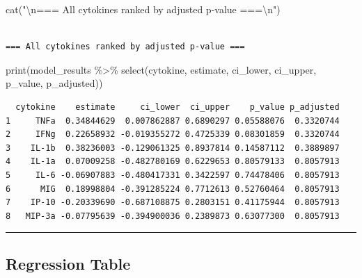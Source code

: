 \documentclass[
  letterpaper,
  DIV=11,
  numbers=noendperiod]{scrartcl}
\newenvironment{Shaded}{\begin{snugshade}}{\end{snugshade}}
\newcommand{\FunctionTok}[1]{\textcolor[rgb]{0.28,0.35,0.67}{#1}}
\newcommand{\NormalTok}[1]{\textcolor[rgb]{0.00,0.23,0.31}{#1}}
\newcommand{\SpecialCharTok}[1]{\textcolor[rgb]{0.37,0.37,0.37}{#1}}
\newcommand{\StringTok}[1]{\textcolor[rgb]{0.13,0.47,0.30}{#1}}
\begin{document}
\begin{Shaded}
\begin{Highlighting}[]
\FunctionTok{cat}\NormalTok{(}\StringTok{"}\SpecialCharTok{\textbackslash{}n}\StringTok{=== All cytokines ranked by adjusted p{-}value ===}\SpecialCharTok{\textbackslash{}n}\StringTok{"}\NormalTok{)}
\end{Highlighting}
\end{Shaded}

\begin{verbatim}

=== All cytokines ranked by adjusted p-value ===
\end{verbatim}

\begin{Shaded}
\begin{Highlighting}[]
\FunctionTok{print}\NormalTok{(model\_results }\SpecialCharTok{\%\textgreater{}\%} \FunctionTok{select}\NormalTok{(cytokine, estimate, ci\_lower, ci\_upper, p\_value, p\_adjusted))}
\end{Highlighting}
\end{Shaded}

\begin{verbatim}
  cytokine    estimate     ci_lower  ci_upper    p_value p_adjusted
1     TNFa  0.34844629  0.007862887 0.6890297 0.05588076  0.3320744
2     IFNg  0.22658932 -0.019355272 0.4725339 0.08301859  0.3320744
3    IL-1b  0.38236003 -0.129061325 0.8937814 0.14587112  0.3889897
4    IL-1a  0.07009258 -0.482780169 0.6229653 0.80579133  0.8057913
5     IL-6 -0.06907883 -0.480417331 0.3422597 0.74478406  0.8057913
6      MIG  0.18998804 -0.391285224 0.7712613 0.52760464  0.8057913
7    IP-10 -0.20339690 -0.687108875 0.2803151 0.41175944  0.8057913
8   MIP-3a -0.07795639 -0.394900036 0.2389873 0.63077300  0.8057913
\end{verbatim}

\begin{center}\rule{0.5\linewidth}{0.5pt}\end{center}

\subsection{Regression Table}\label{regression-table}
\end{document}
